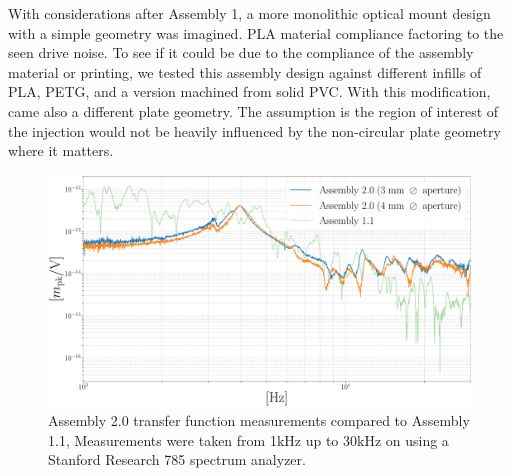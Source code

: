 With considerations after Assembly 1, a more monolithic optical mount design with a simple geometry was imagined. PLA material compliance factoring to the seen drive noise. To see if it could be due to the compliance of the assembly material or printing, we tested this assembly design against different infills of PLA, PETG, and a version machined from solid PVC. With this modification, came also a different plate geometry. The assumption is the region of interest of the injection would not be heavily influenced by the non-circular plate geometry where it matters.



\begin{figure}[H]
    \includegraphics[width=\textwidth]{figs/ALGAAS/results_figs/assembly2/2_0_compare_1_1.pdf} 
    \caption{Assembly 2.0 transfer function measurements compared to Assembly 1.1, Measurements were taken from 1kHz up to 30kHz on using a Stanford Research 785 spectrum analyzer.}
    \label{fig:assembly2and1one}
\end{figure}


